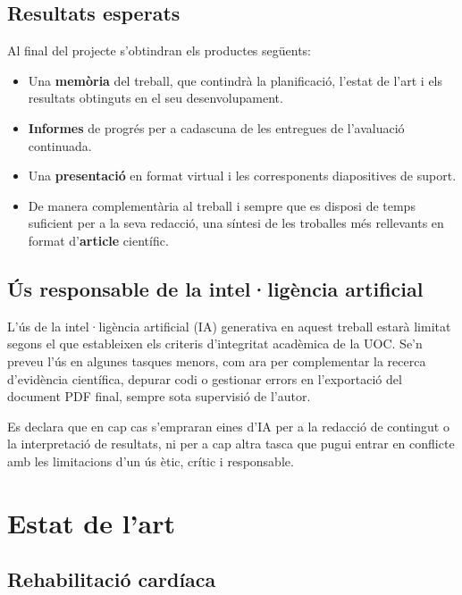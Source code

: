 \documentclass[CAT]{TFUOC}%
\begin{document}
\section{Resultats esperats}\label{resultats-esperats}

Al final del projecte s'obtindran els productes següents:

\begin{itemize}
\item
  Una \textbf{memòria} del treball, que contindrà la planificació, l'estat de l'art i els resultats obtinguts en el seu desenvolupament.
\item
  \textbf{Informes} de progrés per a cadascuna de les entregues de l'avaluació continuada.
\item
  Una \textbf{presentació} en format virtual i les corresponents diapositives de suport.
\item
  De manera complementària al treball i sempre que es disposi de temps suficient per a la seva redacció, una síntesi de les troballes més rellevants en format d'\textbf{article} científic.
\end{itemize}

\section{Ús responsable de la intel·ligència artificial}\label{uxfas-responsable-de-la-intelliguxe8ncia-artificial}

L'ús de la intel·ligència artificial (IA) generativa en aquest treball estarà limitat segons el que estableixen els criteris d'integritat acadèmica de la UOC. Se'n preveu l'ús en algunes tasques menors, com ara per complementar la recerca d'evidència científica, depurar codi o gestionar errors en l'exportació del document PDF final, sempre sota supervisió de l'autor.

Es declara que en cap cas s'empraran eines d'IA per a la redacció de contingut o la interpretació de resultats, ni per a cap altra tasca que pugui entrar en conflicte amb les limitacions d'un ús ètic, crític i responsable.

\chapter{Estat de l'art}\label{estat-de-lart}

\section{Rehabilitació cardíaca}\label{rehabilitaciuxf3-carduxedaca}
\end{document}

